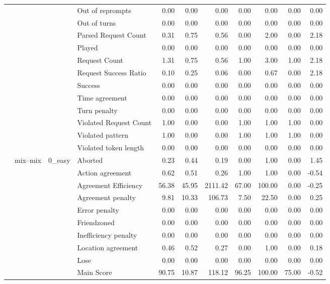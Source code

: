 \begin{tabular}{llllrrrrrrr}
 &  &  & Out of reprompts & 0.00 & 0.00 & 0.00 & 0.00 & 0.00 & 0.00 & 0.00 \\
 &  &  & Out of turns & 0.00 & 0.00 & 0.00 & 0.00 & 0.00 & 0.00 & 0.00 \\
 &  &  & Parsed Request Count & 0.31 & 0.75 & 0.56 & 0.00 & 2.00 & 0.00 & 2.18 \\
 &  &  & Played & 0.00 & 0.00 & 0.00 & 0.00 & 0.00 & 0.00 & 0.00 \\
 &  &  & Request Count & 1.31 & 0.75 & 0.56 & 1.00 & 3.00 & 1.00 & 2.18 \\
 &  &  & Request Success Ratio & 0.10 & 0.25 & 0.06 & 0.00 & 0.67 & 0.00 & 2.18 \\
 &  &  & Success & 0.00 & 0.00 & 0.00 & 0.00 & 0.00 & 0.00 & 0.00 \\
 &  &  & Time agreement & 0.00 & 0.00 & 0.00 & 0.00 & 0.00 & 0.00 & 0.00 \\
 &  &  & Turn penalty & 0.00 & 0.00 & 0.00 & 0.00 & 0.00 & 0.00 & 0.00 \\
 &  &  & Violated Request Count & 1.00 & 0.00 & 0.00 & 1.00 & 1.00 & 1.00 & 0.00 \\
 &  &  & Violated pattern & 1.00 & 0.00 & 0.00 & 1.00 & 1.00 & 1.00 & 0.00 \\
 &  &  & Violated token length & 0.00 & 0.00 & 0.00 & 0.00 & 0.00 & 0.00 & 0.00 \\
\cline{2-11} \cline{3-11}
 & \multirow[t]{378}{*}{mix--mix} & \multirow[t]{27}{*}{0_easy} & Aborted & 0.23 & 0.44 & 0.19 & 0.00 & 1.00 & 0.00 & 1.45 \\
 &  &  & Action agreement & 0.62 & 0.51 & 0.26 & 1.00 & 1.00 & 0.00 & -0.54 \\
 &  &  & Agreement Efficiency & 56.38 & 45.95 & 2111.42 & 67.00 & 100.00 & 0.00 & -0.25 \\
 &  &  & Agreement penalty & 9.81 & 10.33 & 106.73 & 7.50 & 22.50 & 0.00 & 0.25 \\
 &  &  & Error penalty & 0.00 & 0.00 & 0.00 & 0.00 & 0.00 & 0.00 & 0.00 \\
 &  &  & Friendzoned & 0.00 & 0.00 & 0.00 & 0.00 & 0.00 & 0.00 & 0.00 \\
 &  &  & Inefficiency penalty & 0.00 & 0.00 & 0.00 & 0.00 & 0.00 & 0.00 & 0.00 \\
 &  &  & Location agreement & 0.46 & 0.52 & 0.27 & 0.00 & 1.00 & 0.00 & 0.18 \\
 &  &  & Lose & 0.00 & 0.00 & 0.00 & 0.00 & 0.00 & 0.00 & 0.00 \\
 &  &  & Main Score & 90.75 & 10.87 & 118.12 & 96.25 & 100.00 & 75.00 & -0.52 \\

\end{tabular}
